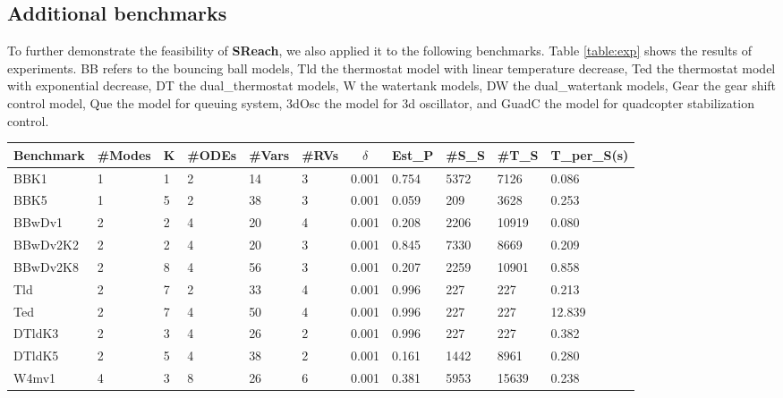 \subsection{Additional benchmarks}
To further demonstrate the feasibility of {\bf SReach}, we also applied it to the following benchmarks. Table \ref{table:exp} shows the results of experiments. BB refers to the bouncing ball models, Tld the thermostat model with linear temperature decrease, Ted the thermostat model with exponential decrease, DT the dual\_thermostat models, W the watertank models, DW the dual\_watertank models, Gear the gear shift control model, Que the model for queuing system, 3dOsc the model for 3d oscillator, and GuadC the model for quadcopter stabilization control. 
\begin{table}[h]
\centering
    \begin{tabular}{|l|l|l|l|l|l|c|l|l|l|l|}
    \hline
    Benchmark & \#Modes & K & \#ODEs & \#Vars & \#RVs & $\delta$ & Est\_P & \#S\_S & \#T\_S & T\_per\_S(s) \\ \hline
    BBK1      & 1       & 1 & 2      & 14    & 3     & 0.001 & 0.754  & 5372      & 7126     & 0.086           \\ \hline
    BBK5      & 1       & 5 & 2      & 38    & 3     & 0.001 & 0.059  & 209       & 3628     & 0.253           \\ \hline
    BBwDv1    & 2       & 2 & 4      & 20    & 4     & 0.001 & 0.208  & 2206      & 10919    & 0.080           \\ \hline
    BBwDv2K2  & 2       & 2 & 4      & 20    & 3     & 0.001 & 0.845  & 7330      & 8669     & 0.209           \\ \hline
    BBwDv2K8  & 2       & 8 & 4      & 56    & 3     & 0.001 & 0.207  & 2259      & 10901    & 0.858           \\ \hline
    Tld       & 2       & 7 & 2      & 33     & 4     & 0.001 & 0.996      & 227         & 227        & 0.213               \\ \hline
    Ted       & 2       & 7 & 4      & 50     & 4     & 0.001 & 0.996      & 227         & 227       & 12.839               \\ \hline
    DTldK3    & 2       & 3 & 4      & 26    & 2     & 0.001 & 0.996  & 227       & 227      & 0.382           \\ \hline
    DTldK5    & 2       & 5 & 4      & 38    & 2     & 0.001 & 0.161  & 1442      & 8961     & 0.280           \\ \hline
    W4mv1       & 4       & 3 & 8      & 26     & 6     & 0.001 & 0.381      & 5953         & 15639        & 0.238         \\ \hline

\end{tabular}
\end{table}

